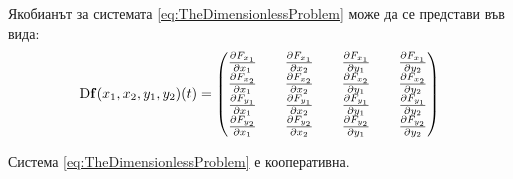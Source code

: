 
Якобианът за системата \ref{eq:TheDimensionlessProblem} може да се представи във вида:
\begin{equation}
  \mathrm{D} \mathbf{f}(x_1, x_2, y_1, y_2)(t) =
  \begin{pmatrix}
    \pdv{F_{x_1}}{x_1} && \pdv{F_{x_1}}{x_2} && \pdv{F_{x_1}}{y_1} && \pdv{F_{x_1}}{y_2} \\
    \pdv{F_{x_2}}{x_1} && \pdv{F_{x_2}}{x_2} && \pdv{F_{x_2}}{y_1} && \pdv{F_{x_2}}{y_2} \\
    \pdv{F_{y_1}}{x_1} && \pdv{F_{y_1}}{x_2} && \pdv{F_{y_1}}{y_1} && \pdv{F_{y_1}}{y_2} \\
    \pdv{F_{y_2}}{x_1} && \pdv{F_{y_2}}{x_2} && \pdv{F_{y_2}}{y_1} && \pdv{F_{y_2}}{y_2}
  \end{pmatrix}
  \end{equation}

\begin{proposition}
  Система \ref{eq:TheDimensionlessProblem} е кооперативна.
\end{proposition}

